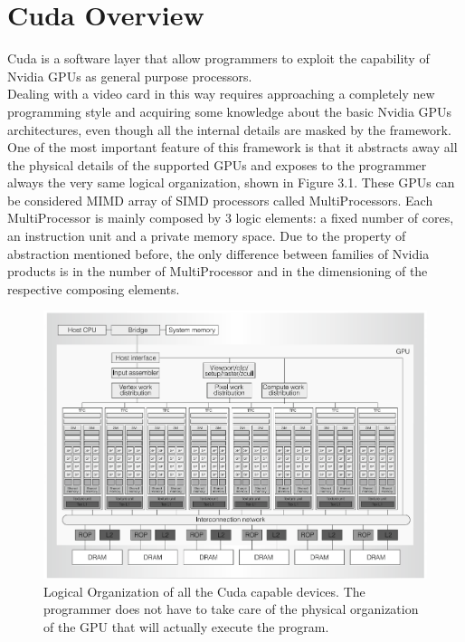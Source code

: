 \chapter{Cuda Overview}\label{sec:cuda}
Cuda is a software layer that allow programmers to exploit the capability of Nvidia GPUs as general purpose processors.\\
Dealing with a video card in this way requires approaching a completely new programming style and acquiring some knowledge about the basic Nvidia GPUs architectures, even though all the internal details are masked by the framework.\\
One of the most important feature of this framework is that it abstracts away all the physical details of the supported GPUs and exposes to the programmer always the very same logical organization, shown in Figure 3.1. These GPUs can be considered MIMD array of SIMD processors called MultiProcessors. Each MultiProcessor is mainly composed by 3 logic elements: a fixed number of cores, an instruction unit and a private memory space. Due to the property of abstraction mentioned before, the only difference between families of Nvidia products is in the number of MultiProcessor and in the dimensioning of the respective composing elements.\\

\begin{figure}[h!bt]
	\centerline{\includegraphics[width=\textwidth]{img/NvidiaGPUsLogicalOrg.png}}
	\caption{Logical Organization of all the Cuda capable devices. The programmer does not have to take care of the physical organization of the GPU that will actually execute the program.}
	\label{fig:NvidiaGPUsLogicalOrg}
\end{figure}

